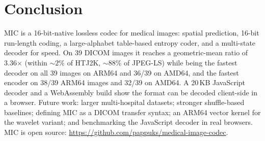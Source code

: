 \documentclass[journal]{IEEEtran}
\begin{document}
\section{Conclusion}
\label{sec:conclusion}

MIC is a 16-bit-native lossless codec for medical images: spatial prediction,
16-bit run-length coding, a large-alphabet table-based entropy coder, and a
multi-state decoder for speed. On 39 DICOM images it reaches a geometric-mean
ratio of 3.36$\times$ (within ${\sim}2\%$ of HTJ2K, ${\sim}88\%$ of JPEG-LS)
while being the fastest decoder on all 39 images on ARM64 and 36/39 on AMD64,
and the fastest encoder on 38/39 ARM64 images and 32/39 on AMD64. A 20\,KB JavaScript
decoder and a WebAssembly build show the format can be decoded client-side in a
browser. Future work: larger multi-hospital datasets; stronger shuffle-based
baselines; defining MIC as a DICOM transfer syntax; an ARM64 vector kernel for
the wavelet variant; and benchmarking the JavaScript decoder in real browsers.
MIC is open source: \url{https://github.com/pappuks/medical-image-codec}.
\end{document}
